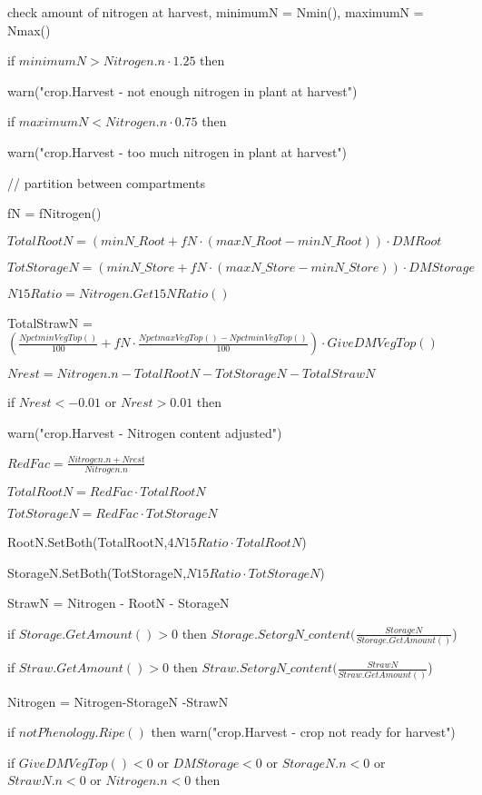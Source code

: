 \documentclass[%
]{scrartcl}
\begin{document}
   check amount of nitrogen at harvest, minimumN = Nmin(), maximumN = Nmax()

   if $minimumN > Nitrogen.n  \cdot  1.25$ then 
   
      
\quad    	warn("crop.Harvest - not enough nitrogen in plant at harvest")
   

   if $maximumN < Nitrogen.n  \cdot  0.75$ then 
  
  
\quad 	  warn("crop.Harvest - too much nitrogen in plant at harvest")
   
   // partition between compartments

   fN = fNitrogen()

  	$TotalRootN  = (minN\_Root+fN \cdot (maxN\_Root-minN\_Root)) \cdot DMRoot$

   $TotStorageN = (minN\_Store+fN \cdot (maxN\_Store-minN\_Store)) \cdot DMStorage$

   $N15Ratio    = Nitrogen.Get15NRatio()$

   TotalStrawN =  $(\tfrac{NpctminVegTop()}{100}+fN \cdot \tfrac{NpctmaxVegTop()-NpctminVegTop()}{100}) \cdot GiveDMVegTop()$

  $ Nrest = Nitrogen.n - TotalRootN - TotStorageN - TotalStrawN$

   if $Nrest<-0.01$ or $Nrest>0.01$ then
  
  \quad     warn("crop.Harvest - Nitrogen content adjusted")
  
\quad  	$RedFac = \tfrac{Nitrogen.n+Nrest}{Nitrogen.n}$

\quad   		$TotalRootN = RedFac \cdot TotalRootN$

\quad    	$TotStorageN = RedFac \cdot TotStorageN$
 


   RootN.SetBoth(TotalRootN,$4N15Ratio \cdot TotalRootN$)

   StorageN.SetBoth(TotStorageN,$N15Ratio \cdot TotStorageN$)

   StrawN = Nitrogen - RootN - StorageN

   if $Storage.GetAmount()>0$ then
   	$Storage.SetorgN\_content(\tfrac{StorageN}{Storage.GetAmount()}$)

   if $Straw.GetAmount()>0$ then
		$Straw.SetorgN\_content(\tfrac{StrawN}{Straw.GetAmount()}$)

	Nitrogen = Nitrogen-StorageN -StrawN

	if $ not Phenology.Ripe()$ then
      warn("crop.Harvest - crop not ready for harvest")

   if $GiveDMVegTop()<0$  or  $DMStorage<0$  or $StorageN.n<0$  or  $StrawN.n<0$  or  $Nitrogen.n<0$ then
   
\end{document}
